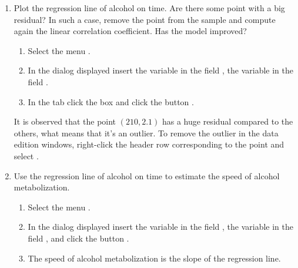 \begin{enumerate}[leftmargin=*]
\begin{enumerate}
\item Plot the regression line of alcohol on time. 
Are there some point with a big residual?
In such a case, remove the point from the sample and compute again the linear correlation coefficient. 
Has the model improved?
\begin{indication}
\begin{enumerate}
\item Select the menu .
\item In the dialog displayed insert the variable  in the field , the
variable  in the field .
\item In the  tab click the box  and click the button .
\end{enumerate}
It is observed that the point $(210,2.1)$ has a huge residual compared to the others, what means that it's an outlier. 
To remove the outlier in the data edition windows, right-click the header row corresponding to the point and select
.
\end{indication}

\item Use the regression line of alcohol on time to estimate the speed of alcohol metabolization. 
\begin{indication}
  \begin{enumerate}
  \item Select the menu .
  \item In the dialog displayed insert the variable  in the field , the variable  in the field , and click the button .
  \item The speed of alcohol metabolization is the slope of the regression line.
  \end{enumerate}
\end{indication}



\end{enumerate}
\end{enumerate}
